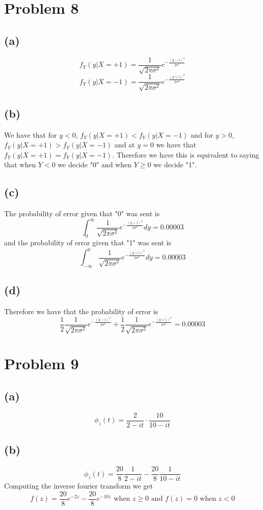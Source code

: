 \section*{Problem 8}
\subsection*{(a)}
$$f_Y(y|X=+1)=\frac{1}{\sqrt{2\pi\sigma^2}}e^{-\frac{(y-1)^2}{2\sigma^2}}$$
$$f_Y(y|X=-1)=\frac{1}{\sqrt{2\pi\sigma^2}}e^{-\frac{(y+1)^2}{2\sigma^2}}$$
\subsection*{(b)}
We have that for $y<0$, $f_Y(y|X=+1)<f_Y(y|X=-1)$ and for $y>0$, $f_Y(y|X=+1)>f_Y(y|X=-1)$
and at $y=0$ we have that $f_Y(y|X=+1)=f_Y(y|X=-1)$. Therefore we have this 
is equivalent to saying that when $Y<0$ we decide "0" and 
when $Y\geq0$ we decide "1".
\subsection*{(c)}
The probability of error given that "0" was sent is
$$\int_{0}^{\infty}\frac{1}{\sqrt{2\pi\sigma^2}}e^{-\frac{(y-1)^2}{2\sigma^2}}dy=0.00003$$
and the probability of error given that "1" was sent is
$$\int_{-\infty}^{0}\frac{1}{\sqrt{2\pi\sigma^2}}e^{-\frac{(y+1)^2}{2\sigma^2}}dy=0.00003$$
\subsection*{(d)}
Therefore we have that the probability of error is
$$\frac{1}{2}\frac{1}{\sqrt{2\pi\sigma^2}}e^{-\frac{(y-1)^2}{2\sigma^2}}+\frac{1}{2}\frac{1}{\sqrt{2\pi\sigma^2}}e^{-\frac{(y+1)^2}{2\sigma^2}}=0.00003$$
\section*{Problem 9}
\subsection*{(a)}
$$\phi_z(t)=\frac{2}{2-it}\cdot \frac{10}{10-it}$$
\subsection*{(b)}
$$\phi_z(t)=\frac{20}{8}\frac{1}{2-it}-\frac{20}{8}\frac{1}{10-it}$$
Computing the inverse fourier transform we get
$$f(z)=\frac{20}{8}e^{-2z}-\frac{20}{8}e^{-10z} \text{ when } z\geq 0 \text{ and } f(z)=0 \text{ when } z<0$$
